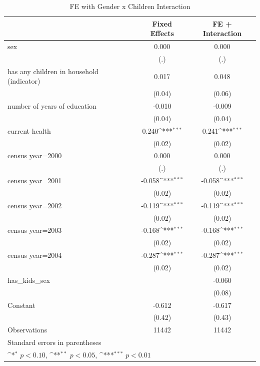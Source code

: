 \begin{table}[htbp]\centering
\def\sym#1{\ifmmode^{#1}\else\(^{#1}\)\fi}
\caption{FE with Gender x Children Interaction}
\begin{tabular}{l*{2}{c}}
\hline\hline
                    &\multicolumn{1}{c}{Fixed Effects}&\multicolumn{1}{c}{FE + Interaction}\\
\hline
sex                 &       0.000         &       0.000         \\
                    &         (.)         &         (.)         \\
[1em]
has any children in household (indicator)&       0.017         &       0.048         \\
                    &      (0.04)         &      (0.06)         \\
[1em]
number of years of education&      -0.010         &      -0.009         \\
                    &      (0.04)         &      (0.04)         \\
[1em]
current health      &       0.240\sym{***}&       0.241\sym{***}\\
                    &      (0.02)         &      (0.02)         \\
[1em]
census year=2000    &       0.000         &       0.000         \\
                    &         (.)         &         (.)         \\
[1em]
census year=2001    &      -0.058\sym{***}&      -0.058\sym{***}\\
                    &      (0.02)         &      (0.02)         \\
[1em]
census year=2002    &      -0.119\sym{***}&      -0.119\sym{***}\\
                    &      (0.02)         &      (0.02)         \\
[1em]
census year=2003    &      -0.168\sym{***}&      -0.168\sym{***}\\
                    &      (0.02)         &      (0.02)         \\
[1em]
census year=2004    &      -0.287\sym{***}&      -0.287\sym{***}\\
                    &      (0.02)         &      (0.02)         \\
[1em]
has\_kids\_sex        &                     &      -0.060         \\
                    &                     &      (0.08)         \\
[1em]
Constant            &      -0.612         &      -0.617         \\
                    &      (0.42)         &      (0.43)         \\
\hline
Observations        &       11442         &       11442         \\
\hline\hline
\multicolumn{3}{l}{\footnotesize Standard errors in parentheses}\\
\multicolumn{3}{l}{\footnotesize \sym{*} \(p<0.10\), \sym{**} \(p<0.05\), \sym{***} \(p<0.01\)}\\
\end{tabular}
\end{table}
